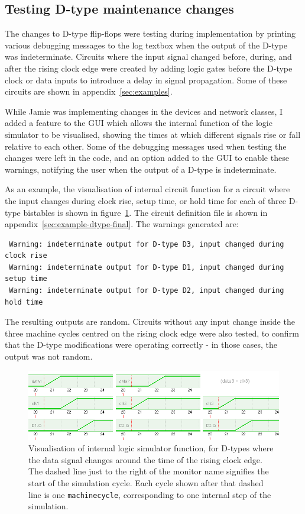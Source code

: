 \documentclass[a4paper,10pt]{article}
\begin{document}
\subsection{Testing D-type maintenance changes}
The changes to D-type flip-flops were testing during implementation by printing various debugging messages to the log textbox when the output of the D-type was indeterminate. Circuits where the input signal changed before, during, and after the rising clock edge were created by adding logic gates before the D-type clock or data inputs to introduce a delay in signal propagation. Some of these circuits are shown in appendix~\ref{sec:examples}.

While Jamie was implementing changes in the devices and network classes, I added a feature to the GUI which allows the internal function of the logic simulator to be visualised, showing the times at which different signals rise or fall relative to each other. Some of the debugging messages used when testing the changes were left in the code, and an option added to the GUI to enable these warnings, notifying the user when the output of a D-type is indeterminate. 

As an example, the visualisation of internal circuit function for a circuit where the input changes during clock rise, setup time, or hold time for each of three D-type bistables is shown in figure~\ref{fig:dtype-each}. The circuit definition file is shown in appendix~\ref{sec:example-dtype-final}. The warnings generated are:

\begin{verbatim}
 Warning: indeterminate output for D-type D3, input changed during clock rise
 Warning: indeterminate output for D-type D1, input changed during setup time
 Warning: indeterminate output for D-type D2, input changed during hold time
\end{verbatim}

The resulting outputs are random. Circuits without any input change inside the three machine cycles centred on the rising clock edge were also tested, to confirm that the D-type modifications were operating correctly - in those cases, the output was not random.

\begin{figure}[h]
 \centering
 \includegraphics[width=16cm]{dtype-test2.png}
 \caption{Visualisation of internal logic simulator function, for D-types where the data signal changes around the time of the rising clock edge. The dashed line just to the right of the monitor name signifies the start of the simulation cycle. Each cycle shown after that dashed line is one \texttt{machinecycle}, corresponding to one internal step of the simulation.}
 \label{fig:dtype-each}
\end{figure}
\end{document}
